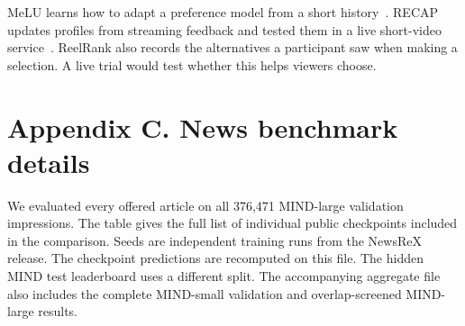 \documentclass[11pt,onecolumn,conference,letterpaper]{IEEEtran}
\begin{document}
MeLU learns how to adapt a preference model from a short history~\cite{melu}. RECAP updates profiles from streaming feedback and tested them in a live short-video service~\cite{recap}. ReelRank also records the alternatives a participant saw when making a selection. A live trial would test whether this helps viewers choose.

\clearpage
\section*{Appendix C. News benchmark details}
We evaluated every offered article on all 376,471 MIND-large validation impressions. The table gives the full list of individual public checkpoints included in the comparison. Seeds are independent training runs from the NewsReX release. The checkpoint predictions are recomputed on this file. The hidden MIND test leaderboard uses a different split. The accompanying aggregate file also includes the complete MIND-small validation and overlap-screened MIND-large results.
\end{document}
